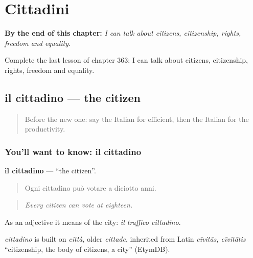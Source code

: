 
\chapter{Cittadini}
\label{ch:it-cittadini}

\begin{chapteropening}
\textbf{By the end of this chapter:} \emph{I can talk about citizens, citizenship, rights, freedom and equality.}

Complete the last lesson of chapter 363: I can talk about citizens, citizenship, rights, freedom and equality.
\end{chapteropening}

\section[il cittadino]{il cittadino — the citizen}

\label{lesson:IT-C363-cittadino}



\begin{quote}
Before the new one: say the Italian for efficient, then the Italian for the productivity.
\end{quote}

\subsection*{You'll want to know: il cittadino}
\textbf{il cittadino} — \textquotedblleft{}the citizen\textquotedblright{}.

\begin{quote}
Ogni cittadino può votare a diciotto anni.
\end{quote}

\begin{quote}
\emph{Every citizen can vote at eighteen.}
\end{quote}

As an adjective it means of the city: \emph{il traffico cittadino}.

\begin{cousinweb}
\emph{cittadino} is built on \emph{città}, older \emph{cittade}, inherited from Latin \emph{cīvitās, cīvitātis} \textquotedblleft{}citizenship, the body of citizens, a city\textquotedblright{} (EtymDB).
\end{cousinweb}

